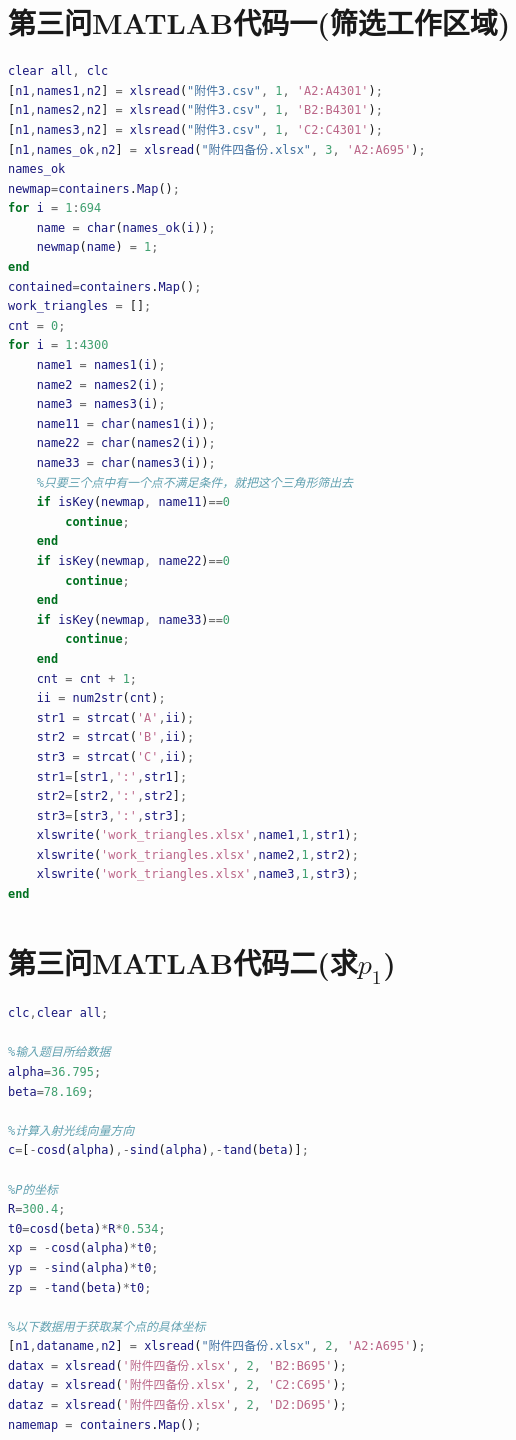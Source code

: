 \documentclass[withoutpreface,bwprint]{cumcmthesis} %
\begin{document}
\begin{appendices}
\begin{lstlisting}[language=matlab]
\end{lstlisting}
\section{第三问MATLAB代码一(筛选工作区域)}
\begin{lstlisting}[language=matlab]
clear all, clc
[n1,names1,n2] = xlsread("附件3.csv", 1, 'A2:A4301');
[n1,names2,n2] = xlsread("附件3.csv", 1, 'B2:B4301');
[n1,names3,n2] = xlsread("附件3.csv", 1, 'C2:C4301');
[n1,names_ok,n2] = xlsread("附件四备份.xlsx", 3, 'A2:A695');
names_ok
newmap=containers.Map();												%	创建一个空的map对象
for i = 1:694
    name = char(names_ok(i));
    newmap(name) = 1;
end
contained=containers.Map();
work_triangles = [];
cnt = 0;
for i = 1:4300
    name1 = names1(i);
    name2 = names2(i);
    name3 = names3(i);
    name11 = char(names1(i));
    name22 = char(names2(i));
    name33 = char(names3(i));
    %只要三个点中有一个点不满足条件，就把这个三角形筛出去
    if isKey(newmap, name11)==0
        continue;
    end
    if isKey(newmap, name22)==0
        continue;
    end
    if isKey(newmap, name33)==0 
        continue;
    end
    cnt = cnt + 1;
    ii = num2str(cnt);
    str1 = strcat('A',ii);
    str2 = strcat('B',ii);
    str3 = strcat('C',ii);
    str1=[str1,':',str1];
    str2=[str2,':',str2];
    str3=[str3,':',str3];
    xlswrite('work_triangles.xlsx',name1,1,str1);
    xlswrite('work_triangles.xlsx',name2,1,str2);
    xlswrite('work_triangles.xlsx',name3,1,str3);
end

\end{lstlisting}
\section{第三问MATLAB代码二(求$p_1$)}
\begin{lstlisting}[language=matlab]
    clc,clear all;

%输入题目所给数据
alpha=36.795;
beta=78.169;

%计算入射光线向量方向
c=[-cosd(alpha),-sind(alpha),-tand(beta)];

%P的坐标
R=300.4;
t0=cosd(beta)*R*0.534;
xp = -cosd(alpha)*t0;
yp = -sind(alpha)*t0;
zp = -tand(beta)*t0;

%以下数据用于获取某个点的具体坐标
[n1,dataname,n2] = xlsread("附件四备份.xlsx", 2, 'A2:A695');
datax = xlsread('附件四备份.xlsx', 2, 'B2:B695');
datay = xlsread('附件四备份.xlsx', 2, 'C2:C695');
dataz = xlsread('附件四备份.xlsx', 2, 'D2:D695');
namemap = containers.Map();


\end{lstlisting}
\end{appendices}
\end{document}
